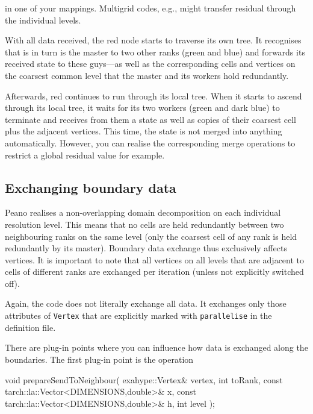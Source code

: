 \noindent
in one of your mappings. Multigrid codes, e.g., might transfer residual through
the individual levels.

With all data received, the red node starts to traverse its own tree. 
It recognises that is in turn is the master to two other ranks (green and blue)
and forwards its received state to these guys---as well as the corresponding
cells and vertices on the coarsest common level that the master and its workers
hold redundantly.

Afterwards, red continues to run through its local tree. 
When it starts to ascend through its local tree, it waits for its two workers
(green and dark blue) to terminate and receives from them a state as well as
copies of their coarsest cell plus the adjacent vertices.
This time, the state is not merged into anything automatically. 
However, you can realise the corresponding merge operations to restrict a global
residual value for example.


\subsection{Exchanging boundary data}

Peano realises a non-overlapping domain decomposition on each individual
resolution level.
This means that no cells are held redundantly between two neighbouring ranks on
the same level (only the coarsest cell of any rank is held redundantly by its
master).
Boundary data exchange thus exclusively affects vertices. 
It is important to note that all vertices on all levels that are adjacent to
cells of different ranks are exchanged per iteration (unless not explicitly
switched off).

Again, the code does not literally exchange all data. 
It exchanges only those attributes of \texttt{Vertex} that are explicitly marked
with \texttt{parallelise} in the definition file.  

There are plug-in points where you can influence how data is exchanged along the
boundaries. The first plug-in point is the operation 

\begin{code}
void prepareSendToNeighbour(
  exahype::Vertex&                             vertex,
  int                                          toRank,
  const tarch::la::Vector<DIMENSIONS,double>&  x,
  const tarch::la::Vector<DIMENSIONS,double>&  h,
  int                                          level
);
\end{code}


